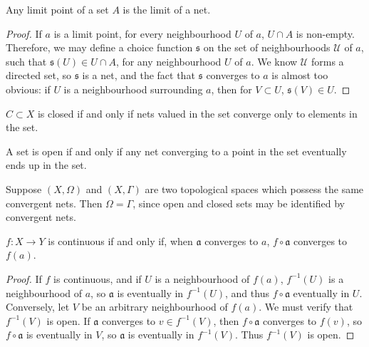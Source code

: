 \begin{lemma}
    Any limit point of a set $A$ is the limit of a net.
\end{lemma}
\begin{proof}
    If $a$ is a limit point, for every neighbourhood $U$ of $a$, $U \cap A$ is non-empty. Therefore, we may define a choice function $\mathfrak{s}$ on the set of neighbourhoods $\mathcal{U}$ of $a$, such that $\mathfrak{s}(U) \in U \cap A$, for any neighbourhood $U$ of $a$. We know $\mathcal{U}$ forms a directed set, so $\mathfrak{s}$ is a net, and the fact that $\mathfrak{s}$ converges to $a$ is almost too obvious: if $U$ is a neighbourhood surrounding $a$, then for $V \subset U$, $\mathfrak{s}(V) \in U$.
\end{proof}

\begin{corollary}
    $C \subset X$ is closed if and only if nets valued in the set converge only to elements in the set.
\end{corollary}

\begin{corollary}
    A set is open if and only if any net converging to a point in the set eventually ends up in the set.
\end{corollary}

Suppose $(X, \Omega)$ and $(X,\Gamma)$ are two topological spaces which possess the same convergent nets. Then $\Omega = \Gamma$, since open and closed sets may be identified by convergent nets.

\begin{lemma}
    $f:X \to Y$ is continuous if and only if, when $\mathfrak{a}$ converges to $a$, $f \circ \mathfrak{a}$ converges to $f(a)$.
\end{lemma}
\begin{proof}
    If $f$ is continuous, and if $U$ is a neighbourhood of $f(a)$, $f^{-1}(U)$ is a neighbourhood of $a$, so $\mathfrak{a}$ is eventually in $f^{-1}(U)$, and thus $f \circ \mathfrak{a}$ eventually in $U$. Conversely, let $V$ be an arbitrary neighbourhood of $f(a)$. We must verify that $f^{-1}(V)$ is open. If $\mathfrak{a}$ converges to $v \in f^{-1}(V)$, then $f \circ \mathfrak{a}$ converges to $f(v)$, so $f \circ \mathfrak{a}$ is eventually in $V$, so $\mathfrak{a}$ is eventually in $f^{-1}(V)$. Thus $f^{-1}(V)$ is open.
\end{proof}

